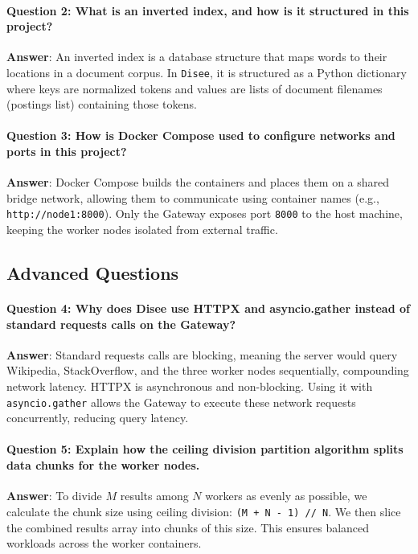 \documentclass[11pt,a4paper]{article}
\begin{document}
\begin{itemize}
\paragraph{Question 2: What is an inverted index, and how is it structured in this project?}
\textbf{Answer}: An inverted index is a database structure that maps words to their locations in a document corpus. In \texttt{Disee}, it is structured as a Python dictionary where keys are normalized tokens and values are lists of document filenames (postings list) containing those tokens.

\paragraph{Question 3: How is Docker Compose used to configure networks and ports in this project?}
\textbf{Answer}: Docker Compose builds the containers and places them on a shared bridge network, allowing them to communicate using container names (e.g., \texttt{http://node1:8000}). Only the Gateway exposes port \texttt{8000} to the host machine, keeping the worker nodes isolated from external traffic.

\subsection{Advanced Questions}

\paragraph{Question 4: Why does Disee use HTTPX and asyncio.gather instead of standard requests calls on the Gateway?}
\textbf{Answer}: Standard requests calls are blocking, meaning the server would query Wikipedia, StackOverflow, and the three worker nodes sequentially, compounding network latency. HTTPX is asynchronous and non-blocking. Using it with \texttt{asyncio.gather} allows the Gateway to execute these network requests concurrently, reducing query latency.

\paragraph{Question 5: Explain how the ceiling division partition algorithm splits data chunks for the worker nodes.}
\textbf{Answer}: To divide $M$ results among $N$ workers as evenly as possible, we calculate the chunk size using ceiling division: \texttt{(M + N - 1) // N}. We then slice the combined results array into chunks of this size. This ensures balanced workloads across the worker containers.


\end{itemize}
\end{document}
